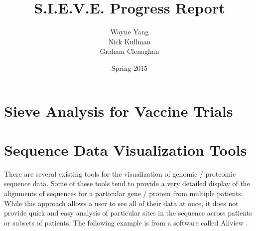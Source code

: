 \documentclass{article}
\begin{document}
\title{S.I.E.V.E. Progress Report}
\author{Wayne Yang \\ Nick Kullman \\ Graham Clenaghan}
\date{Spring 2015}
\maketitle

\section{Sieve Analysis for Vaccine Trials}


\section{Sequence Data Visualization Tools}

There are several existing tools for the visualization of genomic / proteomic sequence data.  Some of these tools tend to provide a very detailed display of the alignments of sequences for a particular gene / protein from multiple patients.  While this approach allows a user to see all of their data at once, it does not provide quick and easy analysis of particular sites in the sequence across patients or subsets of patients.  The following example is from a software called Aliview \cite{aliview}.
\end{document}
